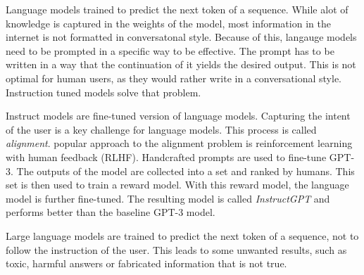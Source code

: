 \documentclass[../../main.tex]{subfiles}
\begin{document}
Language models trained to predict the next token of a sequence.
While alot of knowledge is captured in the weights of the model, most information in the internet is not formatted in conversatonal style.
Because of this, langauge models need to be prompted in a specific way to be effective. The prompt has to be written in a way that the continuation of it yields the desired output.
This is not optimal for human users, as they would rather write in a conversational style. Instruction tuned models solve that problem.

Instruct models are fine-tuned version of language models. Capturing the intent of the user is a key challenge for language models. This process is called \textit{alignment}.
popular approach to the alignment problem is reinforcement learning with human feedback (RLHF). Handcrafted prompts are used to fine-tune GPT-3.
The outputs of the model are collected into a set and ranked by humans. This set is then used to train a reward model. With this reward model, the language model is further fine-tuned.
The resulting model is called \textit{InstructGPT} and performs better than the baseline GPT-3 model.

Large language models are trained to predict the next token of a sequence, not to follow the instruction of the user.
This leads to some unwanted results, such as toxic, harmful answers or fabricated information that is not true.
\end{document}
